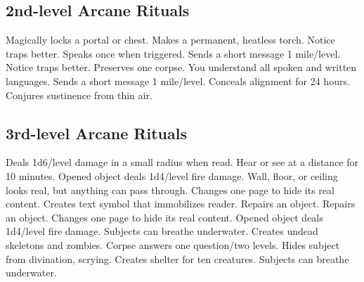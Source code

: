 \subsection{2nd-level Arcane Rituals}
\begin{rituallist}
   Magically locks a portal or chest.
   Makes a permanent, heatless torch.
   Notice traps better.
   Speaks once when triggered.
   Sends a short message 1 mile/level.
   Notice traps better.
   Preserves one corpse.
   You understand all spoken and written languages.
   Sends a short message 1 mile/level.
   Conceals alignment for 24 hours.
   Conjures sustinence from thin air.
\end{rituallist}

\subsection{3rd-level Arcane Rituals}
\begin{rituallist}
   Deals 1d6/level damage in a small radius when read.
   Hear or see at a distance for 10 minutes.
   Opened object deals 1d4/level fire damage.
   Wall, floor, or ceiling looks real, but anything can pass through.
   Changes one page to hide its real content.
   Creates text symbol that immobilizes reader.
   Repairs an object.
   Repairs an object.
   Changes one page to hide its real content.
   Opened object deals 1d4/level fire damage.
   Subjects can breathe underwater.
   Creates undead skeletons and zombies.
   Corpse answers one question/two levels.
   Hides subject from divination, scrying.
   Creates shelter for ten creatures.
   Subjects can breathe underwater.
\end{rituallist}


